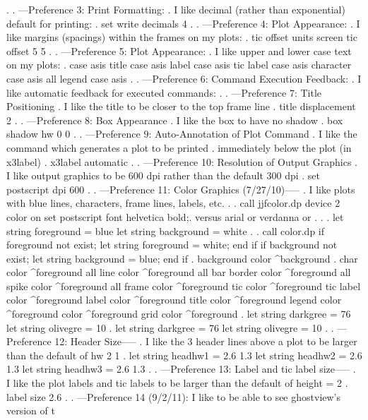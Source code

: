 .
. ---Preference 3: Print Formatting:
.    I like decimal (rather than exponential) default for printing:
.
     set write decimals 4
.
. ---Preference 4: Plot Appearance:
.    I like margins (spacings) within the frames on my plots:
.
     tic offset units screen
     tic offset 5 5
.
. ---Preference 5: Plot Appearance:
.    I like upper and lower case text on my plots:
.
     case asis
     title case asis
     label case asis
     tic label case asis
     character case asis all
     legend case asis
.
. ---Preference 6: Command Execution Feedback:
.    I like automatic feedback for executed commands:
.
. ---Preference 7: Title Positioning
.    I like the title to be closer to the top frame line
.
     title displacement 2
.
. ---Preference 8: Box Appearance
.    I like the box to have no shadow
.
     box shadow hw 0 0
.
. ---Preference 9: Auto-Annotation of Plot Command
.    I like the command which generates a plot to be printed
.    immediately below the plot (in x3label)
.
     x3label automatic
.
. ---Preference 10: Resolution of Output Graphics
.    I like output graphics to be 600 dpi rather than the default 300 dpi
.
     set postscript dpi 600
.
. ---Preference 11: Color Graphics (7/27/10)-----
.    I like plots with blue lines, characters, frame lines, labels, etc.
.
     . call jjfcolor.dp
     device 2 color on
     set postscript font helvetica bold;. versus arial or verdanna or . . .
     let string foreground = blue
     let string background = white
     .
     . call color.dp
     if foreground not exist; let string foreground = white; end if
     if background not exist; let string background = blue; end if
     .
     background color ^background
     .
     char color ^foreground all
     line color ^foreground all
     bar border color ^foreground all
     spike color ^foreground all
     frame color ^foreground
     tic color ^foreground
     tic label color ^foreground
     label color ^foreground
     title color ^foreground
     legend color ^foreground
     color ^foreground
     grid color ^foreground
     .
     let string darkgree = 76
     let string olivegre = 10
     .
     let string darkgree = 76
     let string olivegre = 10
.
. ---Preference 12: Header Size-----
.    I like the 3 header lines above a plot to be larger than the default of     hw 2 1
.
let string headhw1 = 2.6 1.3
let string headhw2 = 2.6 1.3
let string headhw3 = 2.6 1.3
.
. ---Preference 13: Label and tic label size-----
.    I like the plot labels and tic labels to be larger than the default of    height = 2
.
label size 2.6
.
. ---Preference 14 (9/2/11): I like to be able to see ghostview's version of t
